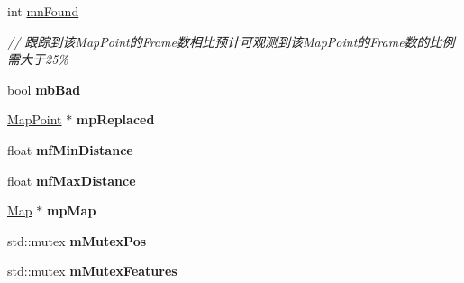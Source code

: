 \begin{DoxyCompactItemize}
\item 
\hypertarget{classORB__SLAM2_1_1MapPoint_a1defea85441b8063ef9ebb47c9959289}{int \hyperlink{classORB__SLAM2_1_1MapPoint_a1defea85441b8063ef9ebb47c9959289}{mn\-Found}}\label{classORB__SLAM2_1_1MapPoint_a1defea85441b8063ef9ebb47c9959289}

\begin{DoxyCompactList}\small\item\em // 跟踪到该\-Map\-Point的\-Frame数相比预计可观测到该\-Map\-Point的\-Frame数的比例需大于25\% \end{DoxyCompactList}\item 
\hypertarget{classORB__SLAM2_1_1MapPoint_aa8f2fc3c4b67c04e97162a5084e1dada}{bool {\bfseries mb\-Bad}}\label{classORB__SLAM2_1_1MapPoint_aa8f2fc3c4b67c04e97162a5084e1dada}

\item 
\hypertarget{classORB__SLAM2_1_1MapPoint_abf1fe1c8a41919e1890b70baa18bd2fb}{\hyperlink{classORB__SLAM2_1_1MapPoint}{Map\-Point} $\ast$ {\bfseries mp\-Replaced}}\label{classORB__SLAM2_1_1MapPoint_abf1fe1c8a41919e1890b70baa18bd2fb}

\item 
\hypertarget{classORB__SLAM2_1_1MapPoint_ac179383327d65067da6febe55cbfc32a}{float {\bfseries mf\-Min\-Distance}}\label{classORB__SLAM2_1_1MapPoint_ac179383327d65067da6febe55cbfc32a}

\item 
\hypertarget{classORB__SLAM2_1_1MapPoint_afc04bae1b7819dd158a572de56074f63}{float {\bfseries mf\-Max\-Distance}}\label{classORB__SLAM2_1_1MapPoint_afc04bae1b7819dd158a572de56074f63}

\item 
\hypertarget{classORB__SLAM2_1_1MapPoint_aad9ad02a540966d12b75460238290d90}{\hyperlink{classORB__SLAM2_1_1Map}{Map} $\ast$ {\bfseries mp\-Map}}\label{classORB__SLAM2_1_1MapPoint_aad9ad02a540966d12b75460238290d90}

\item 
\hypertarget{classORB__SLAM2_1_1MapPoint_a592b97bed3453c0a599336fa848a8cef}{std\-::mutex {\bfseries m\-Mutex\-Pos}}\label{classORB__SLAM2_1_1MapPoint_a592b97bed3453c0a599336fa848a8cef}

\item 
\hypertarget{classORB__SLAM2_1_1MapPoint_a3ab20d400977581ac45a109f5544ffda}{std\-::mutex {\bfseries m\-Mutex\-Features}}\label{classORB__SLAM2_1_1MapPoint_a3ab20d400977581ac45a109f5544ffda}

\end{DoxyCompactItemize}


